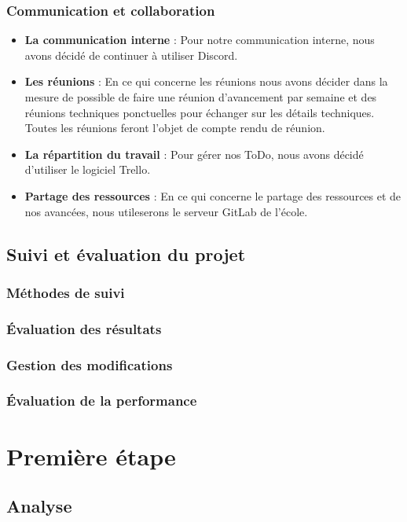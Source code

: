 \documentclass[a4paper, 12pt]{report}
\begin{document}
\subsection{Communication et collaboration}

\begin{itemize}
    \item \textbf{La communication interne} : Pour notre communication interne, nous avons décidé de continuer à utiliser Discord.
    \item \textbf{Les réunions} : En ce qui concerne les réunions nous avons décider dans la mesure de possible de faire une réunion d'avancement par semaine et des réunions techniques ponctuelles pour échanger sur les détails techniques. Toutes les réunions feront l'objet de compte rendu de réunion.
    \item \textbf{La répartition du travail} : Pour gérer nos ToDo, nous avons décidé d'utiliser le logiciel Trello.
    \item \textbf{Partage des ressources} : En ce qui concerne le partage des ressources et de nos avancées, nous utileserons le serveur GitLab de l'école.
\end{itemize}


\clearpage
\section{Suivi et évaluation du projet}
\subsection{Méthodes de suivi}
\subsection{Évaluation des résultats}
\subsection{Gestion des modifications}
\subsection{Évaluation de la performance}


\chapter{Première étape}
\minitoc
{}
\clearpage
\section{Analyse}
\end{document}
